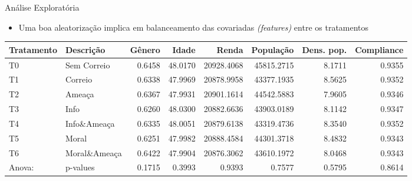 \documentclass[
  12pt,
  ignorenonframetext,
  aspectratio=169]{beamer}
\providecommand{\tightlist}{%
  \setlength{\itemsep}{0pt}\setlength{\parskip}{0pt}}
\begin{document}
\begin{frame}{Análise Exploratória}
\protect\hypertarget{anuxe1lise-exploratuxf3ria}{}
\begin{itemize}
\tightlist
\item
  Uma boa aleatorização implica em balanceamento das covariadas
  \emph{(features)} entre os tratamentos
\end{itemize}

\begin{table}[H]
\centering
\fontsize{8}{10}\selectfont
\begin{threeparttable}
\begin{tabular}[t]{llrrrrrr}
\toprule
Tratamento & Descrição & Gênero & Idade & Renda & População & Dens. pop. & Compliance\\
\midrule
T0 & Sem Correio & 0.6458 & 48.0170 & 20928.4068 & 45815.2715 & 8.1711 & 0.9355\\
T1 & Correio & 0.6338 & 47.9969 & 20878.9958 & 43377.1935 & 8.5625 & 0.9352\\
T2 & Ameaça & 0.6367 & 47.9931 & 20901.1614 & 44542.5883 & 7.9605 & 0.9346\\
T3 & Info & 0.6260 & 48.0300 & 20882.6636 & 43903.0189 & 8.1142 & 0.9347\\
T4 & Info\&Ameaça & 0.6335 & 48.0051 & 20879.6138 & 43319.4736 & 8.3540 & 0.9352\\
\addlinespace
T5 & Moral & 0.6251 & 47.9982 & 20888.4584 & 44301.3718 & 8.4832 & 0.9343\\
T6 & Moral\&Ameaça & 0.6422 & 47.9904 & 20876.3062 & 43610.1972 & 8.0468 & 0.9343\\
\midrule
Anova: & p-values & 0.1715 & 0.3993 & 0.9393 & 0.7577 & 0.5795 & 0.8614\\
\bottomrule
\end{tabular}
\end{threeparttable}
\end{table}
\end{frame}
\end{document}
